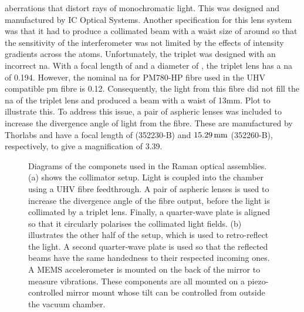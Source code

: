 aberrations that distort rays of monochromatic light. This was designed and
manufactured by IC Optical Systems. Another specification for this lens
system was that it had to produce a collimated beam with a waist size of
around  so that the sensitivity of the
interferometer was not limited by the effects of intensity gradients across
the atoms. Unfortunately, the triplet was designed with an incorrect \ac{na}.
With a focal length of  and a diameter of
, the triplet lens has a \ac{na} of 0.194. However,
the nominal \ac{na} for PM780-HP fibre used in the UHV compatible \ac{pm}
fibre is 0.12. Consequently, the light from this fibre did not fill the
\ac{na} of the triplet lens and produced a beam with a waist of 13mm. {\huge
Plot to illustrate this}. To address this issue, a pair of aspheric lenses
was included to increase the divergence angle of light from the fibre. These
are manufactured by Thorlabs and have a focal length of
 (352230-B) and \(\sivalue{15.29}{\milli\metre}\)
(352260-B), respectively, to give a magnification of 3.39.
\begin{figure}
	\centering
	\def\svgwidth{\columnwidth}
	\subfloat[][]{\scalebox{0.4}{\label{fig:raman_collimator}}}
	\subfloat[][]{\scalebox{0.4}{\label{fig:mirror_mount}}}
	\caption[Drawings of the compenets used in the Raman optics
		assemblies]{Diagrams of the componets used in the Raman optical assemblies.
		(a) shows the collimator setup. Light is coupled into the chamber using a UHV
		fibre feedthrough. A pair of aspheric lenses is used to increase the
		divergence angle of the fibre output, before the light is collimated by a
		triplet lens. Finally, a quarter-wave plate is aligned so that it circularly
		polarises the collimated light fields. (b) illustrates the other half of the
		setup, which is used to retro-reflect the light. A second quarter-wave plate
		is used so that the reflected beams have the same handedness to their
		respected incoming ones. A MEMS accelerometer is mounted on the back of the
		mirror to measure vibrations. These components are all mounted on a
		piezo-controlled mirror mount whose tilt can be controlled from outside the
		vacuum chamber.}
	\label{fig:raman_optics}
\end{figure}

